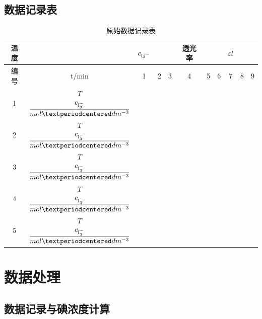 \documentclass[hyperref,a4paper,UTF8]{ctexart}
\begin{document}
\begin{enumerate}
\subsection{数据记录表}
\begin{table}[!htbp]
\centering
\caption{原始数据记录表}
\label{tab:stat}
\begin{tabular}{|c|c|c|c|c|c|c|c|c|c|c|}
\hline
温度& &$c_{\ce{I3^-}}$ &\multicolumn{2}{|c|}{} &透光率 &\multicolumn{2}{|c|}{} & $\varepsilon l$\quad &\multicolumn{2}{|c|}{}\\
\hline
编号&t/min&1&2&3&4&5&6&7&8&9\\
\hline
\multirow{2}{*}{1}&$T$ & \qquad \qquad & \qquad \qquad&\qquad \qquad&\qquad \qquad &\qquad \qquad&\qquad\qquad&\qquad \qquad &\qquad \qquad&\qquad\qquad \\
\cline{2-11}
 &$\dfrac{c_{\ce{I^-_3}}}{mol·dm^{-3}}$ & & & & & & & & &\\
\hline
\multirow{2}{*}{2}&$T$ & & & & & & & & &\\
\cline{2-11}
 &$\dfrac{c_{\ce{I^-_3}}}{mol·dm^{-3}}$ & & & & & & & & &\\
\hline
\multirow{2}{*}{3}&$T$ & & & & & & & & &\\
\cline{2-11}
 &$\dfrac{c_{\ce{I^-_3}}}{mol·dm^{-3}}$ & & & & & & & & &\\
\hline
\multirow{2}{*}{4}&$T$ & & & & & & & & &\\
\cline{2-11}
 &$\dfrac{c_{\ce{I^-_3}}}{mol·dm^{-3}}$ & & & & & & & & & \\
\hline
\multirow{2}{*}{5}&$T$ & & & & & & & & &\\
\cline{2-11}
 &$\dfrac{c_{\ce{I^-_3}}}{mol·dm^{-3}}$ & & & & & & & & &\\
\hline
\end{tabular}
\end{table}
\end{enumerate}

\newpage
\section{数据处理}
\subsection{数据记录与碘浓度计算}
\end{document}
